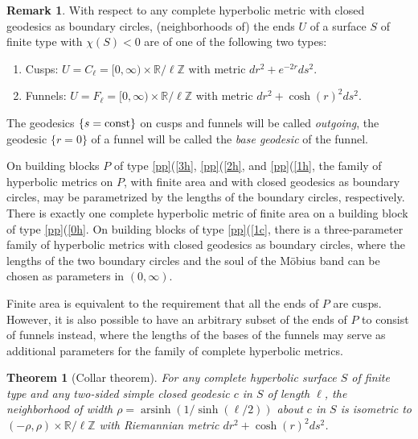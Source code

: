 \documentclass[a4paper,11pt]{amsart}
\numberwithin{equation}{section}
\newtheorem{thm}[equation]{Theorem}
\theoremstyle{definition}
\newtheorem{rem}[equation]{Remark}
\def\R{\mathbb R}
\def\Z{\mathbb Z}
\DeclareMathOperator{\arsinh}{arsinh}
\begin{document}
\begin{rem}
With respect to any complete hyperbolic metric with closed geodesics as boundary circles, (neighborhoods of) the ends $U$ of a surface $S$ of finite type with $\chi(S)<0$ are of one of the following two types:
\begin{enumerate}[label=\arabic*)]
\item\label{cusp} Cusps: $U=C_\ell=[0,\infty)\times\R/\ell\Z$ with metric $dr^2+e^{-2r}ds^2$.
\item\label{funnel} Funnels: $U=F_\ell=[0,\infty)\times\R/\ell\Z$ with metric $dr^2+\cosh(r)^2ds^2$.
\end{enumerate}
The geodesics $\{s=\rm{const}\}$ on cusps and funnels will be called \emph{outgoing},
the geodesic $\{r=0\}$ of a funnel will be called the \emph{base geodesic} of the funnel.
\end{rem}

On building blocks $P$ of type \ref{pp}(\ref{3h}, \ref{pp}(\ref{2h}, and \ref{pp}(\ref{1h}, the family of hyperbolic metrics on $P$, with finite area and with closed geodesics as boundary circles, may be parametrized by the lengths of the boundary circles, respectively.
There is exactly one complete hyperbolic metric of finite area on a building block of type \ref{pp}(\ref{0h}.
On building blocks of type \ref{pp}(\ref{1c}, there is a three-parameter family of hyperbolic metrics with closed geodesics as boundary circles, where the lengths of the two boundary circles and the soul of the M\"obius band can be chosen as parameters in $(0,\infty)$.

Finite area is equivalent to the requirement that all the ends of $P$ are cusps.
However, it is also possible to have an arbitrary subset of the ends of $P$ to consist of funnels instead, where the lengths of the bases of the funnels may serve as additional parameters for the family of complete hyperbolic metrics.

\begin{thm}[Collar theorem]\label{coll}
For any complete hyperbolic surface $S$ of finite type and any two-sided simple closed geodesic $c$ in $S$ of length $\ell$,
the neighborhood of width $\rho=\arsinh(1/\sinh(\ell/2))$ about $c$ in $S$ is isometric to $(-\rho,\rho)\times\R/\ell\Z$ with Riemannian metric $dr^2+\cosh(r)^2ds^2$.
\end{thm}
\end{document}
